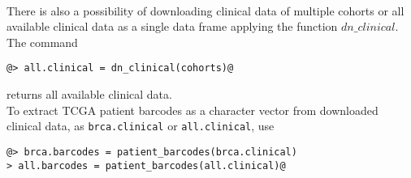 \documentclass{TechReport}
\begin{document}
\ \\
There is also a possibility of downloading clinical data of multiple cohorts or all
available clinical data as a single data frame
applying the function $dn\_clinical$. The command
\begin{lstlisting}[style=base]
@> all.clinical = dn_clinical(cohorts)@
\end{lstlisting}
returns all available clinical data.\\
To extract TCGA patient barcodes as a character vector from downloaded clinical
data, as {\tt brca.clinical} or {\tt all.clinical}, use
\begin{lstlisting}[style=base]
@> brca.barcodes = patient_barcodes(brca.clinical)
> all.barcodes = patient_barcodes(all.clinical)@
\end{lstlisting}
\end{document}
